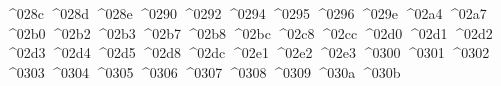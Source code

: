 {  ^^^^028c%
  ^^^^028d%
  ^^^^028e%
  ^^^^0290%
  ^^^^0292%
  ^^^^0294%
  ^^^^0295%
  ^^^^0296%
  ^^^^029e%
  ^^^^02a4%
  ^^^^02a7%
  ^^^^02b0%
  ^^^^02b2%
  ^^^^02b3%
  ^^^^02b7%
  ^^^^02b8%
  ^^^^02bc%
  ^^^^02c8%
  ^^^^02cc%
  ^^^^02d0%
  ^^^^02d1%
  ^^^^02d2%
  ^^^^02d3%
  ^^^^02d4%
  ^^^^02d5%
  ^^^^02d8%
  ^^^^02dc%
  ^^^^02e1%
  ^^^^02e2%
  ^^^^02e3%
  ^^^^0300%
  ^^^^0301%
  ^^^^0302%
  ^^^^0303%
  ^^^^0304%
  ^^^^0305%
  ^^^^0306%
  ^^^^0307%
  ^^^^0308%
  ^^^^0309%
  ^^^^030a%
  ^^^^030b%
}
